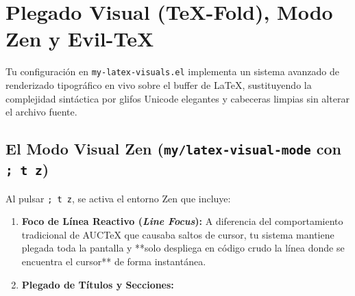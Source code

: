 \documentclass[11pt,book,spanish,alphabetic]{apuntes-scr}
\begin{document}
\chapter{Plegado Visual (TeX-Fold), Modo Zen y Evil-TeX}

Tu configuración en \texttt{my-latex-visuals.el} implementa un sistema avanzado de renderizado tipográfico en vivo sobre el buffer de \LaTeX, sustituyendo la complejidad sintáctica por glifos Unicode elegantes y cabeceras limpias sin alterar el archivo fuente.

\section{El Modo Visual Zen (\texttt{my/latex-visual-mode} con \texttt{; t z})}
Al pulsar \texttt{; t z}, se activa el entorno Zen que incluye:
\begin{enumerate}[label=\bfseries\arabic*., leftmargin=10mm]
    \item \textbf{Foco de Línea Reactivo (\textit{Line Focus}):} A diferencia del comportamiento tradicional de AUCTeX que causaba saltos de cursor, tu sistema mantiene plegada toda la pantalla y **solo despliega en código crudo la línea donde se encuentra el cursor** de forma instantánea.
    \item \textbf{Plegado de Títulos y Secciones:}
\end{enumerate}
\end{document}
